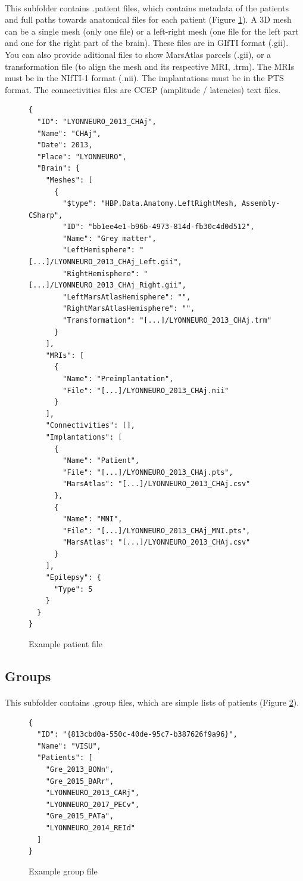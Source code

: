 \documentclass[a4paper]{article}
\begin{document}
\paragraph{} This subfolder contains .patient files, which contains metadata of the patients and full paths towards anatomical files for each patient (Figure \ref{patientFile}). A 3D mesh can be a single mesh (only one file) or a left-right mesh (one file for the left part and one for the right part of the brain). These files are in GIfTI format (.gii). You can also provide aditional files to show MarsAtlas parcels (.gii), or a transformation file (to align the mesh and its respective MRI, .trm). The MRIs must be in the NIfTI-1 format (.nii). The implantations must be in the PTS format. The connectivities files are CCEP (amplitude / latencies) text files.
\begin{figure}[H]
\begin{lstlisting}
{
  "ID": "LYONNEURO_2013_CHAj",
  "Name": "CHAj",
  "Date": 2013,
  "Place": "LYONNEURO",
  "Brain": {
    "Meshes": [
      {
        "$type": "HBP.Data.Anatomy.LeftRightMesh, Assembly-CSharp",
        "ID": "bb1ee4e1-b96b-4973-814d-fb30c4d0d512",
        "Name": "Grey matter",
        "LeftHemisphere": "[...]/LYONNEURO_2013_CHAj_Left.gii",
        "RightHemisphere": "[...]/LYONNEURO_2013_CHAj_Right.gii",
        "LeftMarsAtlasHemisphere": "",
        "RightMarsAtlasHemisphere": "",
        "Transformation": "[...]/LYONNEURO_2013_CHAj.trm"
      }
    ],
    "MRIs": [
      {
        "Name": "Preimplantation",
        "File": "[...]/LYONNEURO_2013_CHAj.nii"
      }
    ],
    "Connectivities": [],
    "Implantations": [
      {
        "Name": "Patient",
        "File": "[...]/LYONNEURO_2013_CHAj.pts",
        "MarsAtlas": "[...]/LYONNEURO_2013_CHAj.csv"
      },
      {
        "Name": "MNI",
        "File": "[...]/LYONNEURO_2013_CHAj_MNI.pts",
        "MarsAtlas": "[...]/LYONNEURO_2013_CHAj.csv"
      }
    ],
    "Epilepsy": {
      "Type": 5
    }
  }
}
\end{lstlisting}
\caption{\label{patientFile}Example patient file}
\end{figure}
\subsection{Groups}
\paragraph{} This subfolder contains .group files, which are simple lists of patients (Figure \ref{groupFile}).
\begin{figure}[H]
\begin{lstlisting}
{
  "ID": "{813cbd0a-550c-40de-95c7-b387626f9a96}",
  "Name": "VISU",
  "Patients": [
    "Gre_2013_BONn",
    "Gre_2015_BARr",
    "LYONNEURO_2013_CARj",
    "LYONNEURO_2017_PECv",
    "Gre_2015_PATa",
    "LYONNEURO_2014_REId"
  ]
}
\end{lstlisting}
\caption{\label{groupFile}Example group file}
\end{figure}
\end{document}
